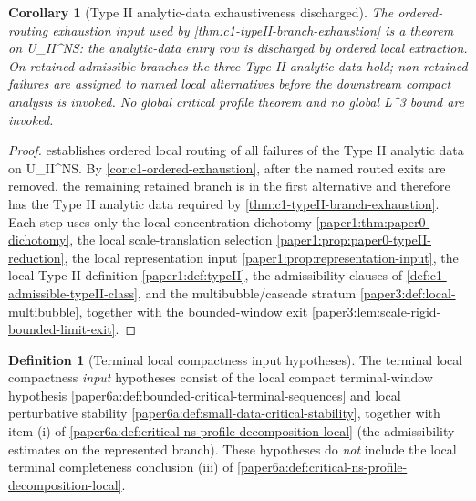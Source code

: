 \documentclass[11pt]{amsart}
\def\({}%
\def\){}%
\def\mathrm#1{#1}%
\theoremstyle{plain}
\newtheorem{corollary}[corollary]{Corollary}
\theoremstyle{definition}
\newtheorem{definition}[definition]{Definition}
\theoremstyle{remark}
\begin{document}
\begin{corollary}[Type II analytic-data exhaustiveness discharged]
\label{paper6a:cor:typeII-analytic-data-exhaustiveness-discharged}
The ordered-routing exhaustion input used by
\cref{thm:c1-typeII-branch-exhaustion} is a theorem on
\(\mathcal U_{\mathrm{II}}^{NS}\): the analytic-data entry row is
discharged by ordered local extraction.  On retained admissible branches the
three Type II analytic data hold; non-retained failures are assigned to named
local alternatives before the downstream compact analysis is invoked.  No
global critical profile theorem and no global \(L^3\) bound are invoked.
\end{corollary}

\begin{proof}
 establishes ordered local
routing of all failures of the Type II analytic data on
\(\mathcal U_{\mathrm{II}}^{NS}\).  By
\cref{cor:c1-ordered-exhaustion}, after the named routed exits are removed, the
remaining retained branch is in the first alternative and therefore has the
Type II analytic data required by \cref{thm:c1-typeII-branch-exhaustion}.
Each step uses only the local concentration dichotomy
\cref{paper1:thm:paper0-dichotomy}, the local scale-translation selection
\cref{paper1:prop:paper0-typeII-reduction}, the local representation input
\cref{paper1:prop:representation-input}, the local Type II definition
\cref{paper1:def:typeII}, the admissibility clauses of
\cref{def:c1-admissible-typeII-class}, and the multibubble/cascade
stratum \cref{paper3:def:local-multibubble}, together with the bounded-window
exit \cref{paper3:lem:scale-rigid-bounded-limit-exit}.
\end{proof}

\begin{definition}[Terminal local compactness input hypotheses]
\label{paper6a:def:terminal-critical-profile-input-hypotheses}
The terminal local compactness \emph{input} hypotheses consist of the local
compact terminal-window hypothesis
\cref{paper6a:def:bounded-critical-terminal-sequences} and local
perturbative stability
\cref{paper6a:def:small-data-critical-stability}, together with item
\textup{(i)} of
\cref{paper6a:def:critical-ns-profile-decomposition-local} (the admissibility
estimates on the represented branch).  These hypotheses do \emph{not}
include the local terminal completeness conclusion
\textup{(iii)} of
\cref{paper6a:def:critical-ns-profile-decomposition-local}.
\end{definition}
\end{document}
